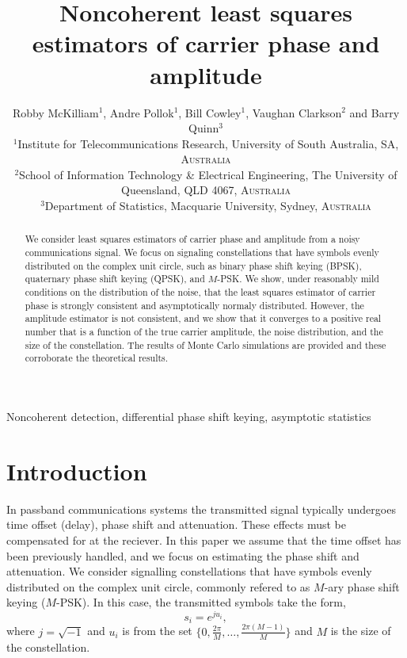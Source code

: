 \documentclass[conference]{IEEEtran}
\title{Noncoherent least squares estimators of carrier phase and amplitude}
\author{Robby McKilliam$^{1}$, Andre Pollok$^{1}$, Bill Cowley$^{1}$, Vaughan Clarkson$^{2}$ and Barry Quinn$^{3}$ \vspace{0.2cm} \\
\small $^{1}$Institute for Telecommunications Research, University of South Australia, SA, \textsc{Australia} \vspace{0.1cm} \\
\small $^{2}$School of Information Technology \& Electrical Engineering, The University of Queensland, QLD 4067, \textsc{Australia} \vspace{0.1cm} \\
\small $^{3}$Department of Statistics, Macquarie University, Sydney, \textsc{Australia} \\}
\begin{document}
\maketitle

\begin{abstract}
We consider least squares estimators of carrier phase and amplitude from a noisy communications signal.  We focus on signaling constellations that have symbols evenly distributed on the complex unit circle, such as binary phase shift keying (BPSK), quaternary phase shift keying (QPSK), and $M$-PSK.  We show, under reasonably mild conditions on the distribution of the noise, that the least squares estimator of carrier phase is strongly consistent and asymptotically normaly distributed.  However, the amplitude estimator is not consistent, and we show that it converges to a positive real number that is a function of the true carrier amplitude, the noise distribution, and the size of the constellation.  The results of Monte Carlo simulations are provided and these corroborate the theoretical results.
\end{abstract}
\begin{IEEEkeywords}
Noncoherent detection, differential phase shift keying, asymptotic statistics
\end{IEEEkeywords}

\section{Introduction}

\newcommand{\calC}{\mathcal C}

In passband communications systems the transmitted signal typically undergoes time offset (delay), phase shift and attenuation.  These effects must be compensated for at the reciever. In this paper we assume that the time offset has been previously handled, and we focus on estimating the phase shift and attenuation.  We consider signalling constellations that have symbols evenly distributed on the complex unit circle, commonly refered to as $M$-ary phase shift keying ($M$-PSK).  In this case, the transmitted symbols take the form,
\[
s_i = e^{j u_i},
\]
where $j = \sqrt{-1}$ and $u_i$ is from the set $\{0, \tfrac{2\pi}{M}, \dots, \tfrac{2\pi(M-1)}{M}\}$ and $M$ is the size of the constellation.  %
\end{document}
